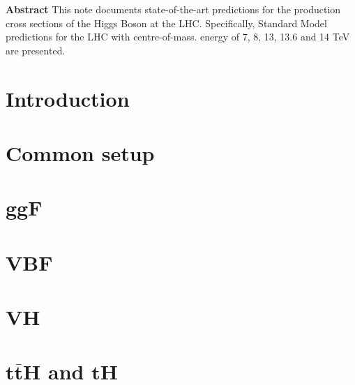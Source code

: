 \documentclass[11pt]{article}
\begin{document}
\begin{titlepage}


\mbox{}\vspace*{3em}
%
\begin{center}
    \textbf{Abstract}
 This note documents state-of-the-art predictions for the production cross sections of the Higgs Boson at the LHC. 
 Specifically, Standard Model predictions for the LHC with centre-of-mass. energy of 7, 8, 13, 13.6 and 14 TeV are presented.
\end{center}
%
 \end{titlepage}
 \newpage
 \tableofcontents

\section{Introduction}


\section{Common setup}


\section{ggF}


\section{VBF}


\section{VH}


\section{$\boldsymbol{t\bar{t}H}$ and $\boldsymbol{tH}$}


\end{document}
